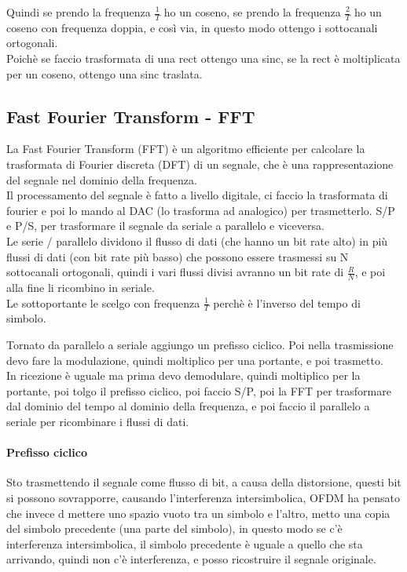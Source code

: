 Quindi se prendo la frequenza $\frac 1 T$ ho un coseno, se prendo la frequenza $\frac 2 T$ ho un coseno con frequenza doppia, e così via, 
in questo modo ottengo i sottocanali ortogonali.\\

Poichè se faccio trasformata di una rect ottengo una sinc, se la rect è moltiplicata per un coseno, ottengo una sinc traslata.
\subsection{Fast Fourier Transform - FFT}
La Fast Fourier Transform (FFT) è un algoritmo efficiente per calcolare la trasformata di Fourier discreta (DFT) di un segnale,
che è una rappresentazione del segnale nel dominio della frequenza.\\

Il processamento del segnale è fatto a livello digitale, ci faccio la trasformata di fourier e poi lo mando al DAC (lo trasforma ad analogico) per trasmetterlo.
S/P e P/S, per trasformare il segnale da seriale a parallelo e viceversa.\\

Le serie / parallelo dividono il flusso di dati (che hanno un bit rate alto) in più flussi di dati (con bit rate più basso) 
che possono essere trasmessi su N sottocanali ortogonali, quindi i vari flussi divisi avranno un bit rate di $\frac R N$, e poi alla fine li ricombino in seriale.\\
Le sottoportante le scelgo con frequenza $\frac 1 T$ perchè è l'inverso del tempo di simbolo.

Tornato da parallelo a seriale aggiungo un prefisso ciclico. Poi nella trasmissione devo fare la modulazione, quindi moltiplico per una portante, e poi trasmetto.\\
In ricezione è uguale ma prima devo demodulare, quindi moltiplico per la portante, poi tolgo il prefisso ciclico, poi faccio S/P, poi la FFT per 
trasformare dal dominio del tempo al dominio della frequenza, e poi faccio il parallelo a seriale per ricombinare i flussi di dati.\\

\paragraph{Prefisso ciclico}
Sto trasmettendo il segnale come flusso di bit, a causa della distorsione, questi bit si possono sovrapporre, causando l'interferenza intersimbolica, 
OFDM ha pensato che invece d mettere uno spazio vuoto tra un simbolo e l'altro, metto una copia del simbolo precedente (una parte del simbolo), 
in questo modo se c'è interferenza intersimbolica, il simbolo precedente è uguale a quello che sta arrivando, quindi non c'è interferenza, 
e posso ricostruire il segnale originale.\\


